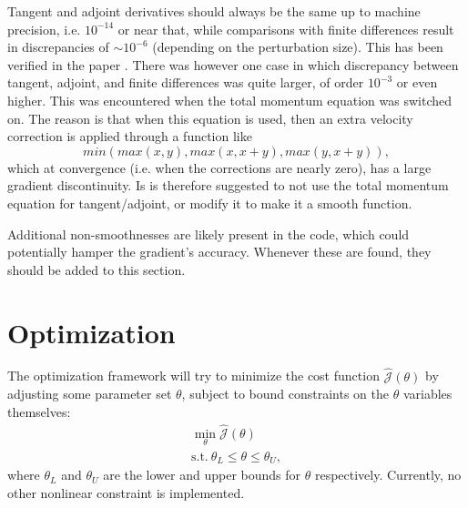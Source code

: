 Tangent and adjoint derivatives should always be the same up to machine precision, i.e. $10^{-14}$ or near that, while comparisons with finite differences result in discrepancies of $\sim 10^{-6}$ (depending on the perturbation size). This has been verified in the paper \cite{carlijcp}. There was however one case in which discrepancy between tangent, adjoint, and finite differences was quite larger, of order $10^{-3}$ or even higher. This was encountered when the total momentum equation was switched on. The reason is that when this equation is used, then an extra velocity correction is applied through a function like
\begin{equation*}
min(max(x,y),max(x,x+y),max(y,x+y)),
\end{equation*}
which at convergence (i.e. when the corrections are nearly zero), has a large gradient discontinuity. Is is therefore suggested to not use the total momentum equation for tangent/adjoint, or modify it to make it a smooth function.

Additional non-smoothnesses are likely present in the code, which could potentially hamper the gradient's accuracy. Whenever these are found, they should be added to this section.

\section{Optimization}\label{sec:optimization}

The optimization framework will try to minimize the cost function $\hat{\mathcal{J}}(\theta)$ by adjusting some parameter set $\theta$, subject to bound constraints on the $\theta$ variables themselves:
\begin{equation*}\label{eq:optim}
\begin{array}{ll}
\min\limits_{\theta} \hat{\mathcal{J}}(\theta) \\
\mathrm{s.t.}~\theta_{L}\le\theta\le\theta_{U},
\end{array}
\end{equation*}
where $\theta_{L}$ and $\theta_{U}$ are the lower and upper bounds for $\theta$ respectively. Currently, no other nonlinear constraint is implemented.

